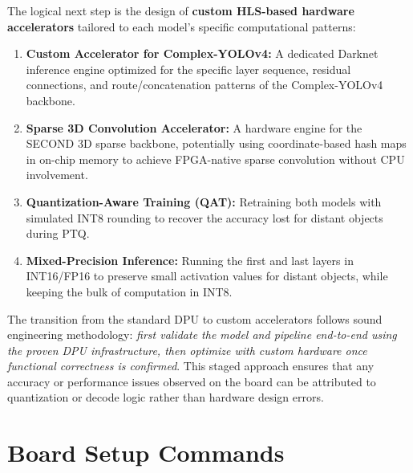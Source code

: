 \documentclass[12pt, a4paper]{report}
\begin{document}
The logical next step is the design of \textbf{custom HLS-based hardware accelerators} tailored to each model's specific computational patterns:

\begin{enumerate}

    \item \textbf{Custom Accelerator for Complex-YOLOv4:} A dedicated Darknet inference engine optimized for the specific layer sequence, residual connections, and route/concatenation patterns of the Complex-YOLOv4 backbone.

    \item \textbf{Sparse 3D Convolution Accelerator:} A hardware engine for the SECOND 3D sparse backbone, potentially using coordinate-based hash maps in on-chip memory to achieve FPGA-native sparse convolution without CPU involvement.

    \item \textbf{Quantization-Aware Training (QAT):} Retraining both models with simulated INT8 rounding to recover the accuracy lost for distant objects during PTQ.

    \item \textbf{Mixed-Precision Inference:} Running the first and last layers in INT16/FP16 to preserve small activation values for distant objects, while keeping the bulk of computation in INT8.
\end{enumerate}

The transition from the standard DPU to custom accelerators follows sound engineering methodology: \textit{first validate the model and pipeline end-to-end using the proven DPU infrastructure, then optimize with custom hardware once functional correctness is confirmed}. This staged approach ensures that any accuracy or performance issues observed on the board can be attributed to quantization or decode logic rather than hardware design errors.






\appendix

\chapter{Board Setup Commands}
\end{document}
